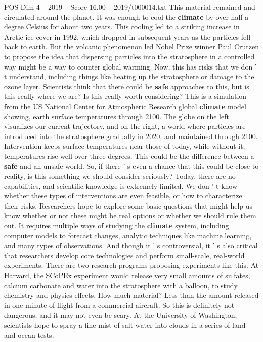 \begin{textsample}{POS Dim 4 – 2019 – Score 16.00 – 2019/t000014.txt}
This material remained and circulated around the planet.
It was enough to cool the \textbf{climate} by over half a degree Celsius for about two years.
This cooling led to a striking increase in Arctic ice cover in 1992, which dropped in subsequent years as the particles fell back to earth.
But the volcanic phenomenon led Nobel Prize winner Paul Crutzen to propose the idea that dispersing particles into the stratosphere in a controlled way might be a way to counter global warming.
Now, this has risks that we don ' t understand, including things like heating up the stratosphere or damage to the ozone layer.
Scientists think that there could be \textbf{safe} approaches to this, but is this really where we are?
Is this really worth considering?
This is a simulation from the US National Center for Atmospheric Research global \textbf{climate} model showing, earth surface temperatures through 2100.
The globe on the left visualizes our current trajectory, and on the right, a world where particles are introduced into the stratosphere gradually in 2020, and maintained through 2100.
Intervention keeps surface temperatures near those of today, while without it, temperatures rise well over three degrees.
This could be the difference between a \textbf{safe} and an unsafe world.
So, if there ' s even a chance that this could be close to reality, is this something we should consider seriously?
Today, there are no capabilities, and scientific knowledge is extremely limited.
We don ' t know whether these types of interventions are even feasible, or how to characterize their risks.
Researchers hope to explore some basic questions that might help us know whether or not these might be real options or whether we should rule them out.
It requires multiple ways of studying the \textbf{climate} system, including computer models to forecast changes, analytic techniques like machine learning, and many types of observations.
And though it ' s controversial, it ' s also critical that researchers develop core technologies and perform small-scale, real-world experiments.
There are two research programs proposing experiments like this.
At Harvard, the SCoPEx experiment would release very small amounts of sulfates, calcium carbonate and water into the stratosphere with a balloon, to study chemistry and physics effects.
How much material?
Less than the amount released in one minute of flight from a commercial aircraft.
So this is definitely not dangerous, and it may not even be scary.
At the University of Washington, scientists hope to spray a fine mist of salt water into clouds in a series of land and ocean tests.

\end{textsample}
